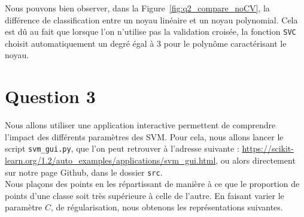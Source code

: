 \documentclass{article}
\begin{document}
Nous pouvons bien observer, dans la Figure~\ref{fig:q2_compare_noCV}, la différence de classification entre un noyau linéaire et un noyau polynomial. Cela est dû au fait que lorsque l'on n'utilise pas la validation croisée, la fonction \texttt{SVC} choisit automatiquement un degré égal à 3 pour le polynôme caractérisant le noyau.

\section{Question 3}
Nous allons utiliser une application interactive permettent de comprendre l'impact des différents paramètres des SVM. Pour cela, nous allons lancer le script \texttt{svm\_gui.py}, que l'on peut retrouver à l'adresse suivante : \url{https://scikit-learn.org/1.2/auto_examples/applications/svm_gui.html}, ou alors directement sur notre page Github, dans le dossier \texttt{src}.\\
Nous plaçons des points en les répartissant de manière à ce que le proportion de points d'une classe soit très supérieure à celle de l'autre. En faisant varier le paramètre $C$, de régularisation, nous obtenons les représentations suivantes.
\end{document}
